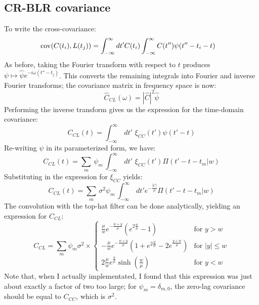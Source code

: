 \documentclass[11pt,a4paper]{article}
\begin{document}
\subsection{CR-BLR covariance}
To write the cross-covariance:
\begin{align}
{\rm cov}(C(t_i),L(t_j))& = \int_{-\infty}^{\infty}dt'C(t_i)\int_{-\infty}^{\infty}C(t'')\psi(t''-t_i-t)
\end{align}
As before, taking the Fourier transform with respect to $t$ produces
$\psi\mapsto \hat{\psi}e^{-i\omega(t''-t_j)}$. This converts the
remaining integrals into Fourier and inverse Fourier transforms; the
covariance matrix in frequency space is now:
\begin{equation}
  \hat{C}_{CL}(\omega) = |\hat{C}|^2\hat{\psi}
\end{equation}
Performing the inverse transform gives us the expression for the
time-domain covariance:
\begin{equation}
C_{CL}(t) = \int_{-\infty}^{\infty}\,dt'\,\, \xi_{CC}(t')\psi(t'-t)
\end{equation}
Re-writing $\psi$ in its parameterized form, we have:
\begin{equation}
C_{CL}(t) = \sum\limits_{m}\, \psi_m\,\int_{-\infty}^{\infty}\,dt'\,\,\xi_{CC}(t')\Pi(t'-t-t_m|w)
\end{equation}
Substituting in the expression for $\xi_{CC}$ yields:
\begin{equation}
C_{CL}(t) = \sum\limits_{m}\, \sigma^2\psi_m\,\int_{-\infty}^{\infty}\,dt'e^{-\frac{|t'|}{\mu}}\Pi(t'-t-t_m|w)
\end{equation}
The convolution with the top-hat filter can be done analytically,
yielding an expression for $C_{CL}$:
\begin{equation}
  C_{CL}=\sum\limits_{m}\psi_m\sigma^2\times
  \begin{cases}
    \frac{\mu}{w}e^{-\frac{w+y}{\mu}}\left(e^{2\frac{w}{\mu}}-1\right)
    & \text{for $y > w$} \\
    -\frac{\mu}{w}e^{-\frac{w+y}{\mu}}\left(1+e^{2\frac{y}{w}}-2e^{\frac{y+w}{\mu}}\right)
    & \text{for $|y|\leq w$} \\
    2\frac{\mu}{w}e^{\frac{y}{\mu}}\sinh\left(\frac{w}{\mu}\right) &
    \text{for $y < w$}
  \end{cases}
\end{equation}
Note that, when I actually implementated, I found that this expression
was just about exactly a factor of two too large; for
$\psi_m=\delta_{m,0}$, the zero-lag covariance should be equal to
$C_{CC}$, which is $\sigma^2$. 
\end{document}
